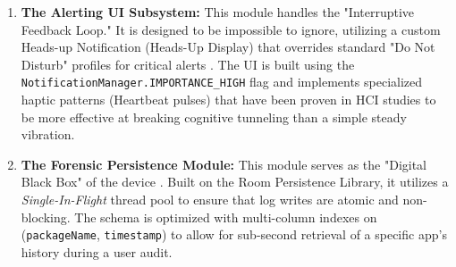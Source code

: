 \documentclass[12pt,a4paper]{report}
\begin{document}
\begin{enumerate}
\begin{enumerate}
        \item \textbf{The Alerting UI Subsystem:} This module handles the "Interruptive Feedback Loop." It is designed to be impossible to ignore, utilizing a custom Heads-up Notification (Heads-Up Display) that overrides standard "Do Not Disturb" profiles for critical alerts \cite{privacydot}. The UI is built using the \texttt{NotificationManager.IMPORTANCE\_HIGH} flag and implements specialized haptic patterns (Heartbeat pulses) that have been proven in HCI studies to be more effective at breaking cognitive tunneling than a simple steady vibration.
        \item \textbf{The Forensic Persistence Module:} This module serves as the "Digital Black Box" of the device \cite{smarthome}. Built on the Room Persistence Library, it utilizes a \textit{Single-In-Flight} thread pool to ensure that log writes are atomic and non-blocking. The schema is optimized with multi-column indexes on (\texttt{packageName}, \texttt{timestamp}) to allow for sub-second retrieval of a specific app's history during a user audit.
    \end{enumerate}


\end{enumerate}
\end{document}
